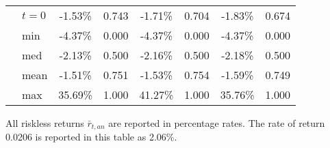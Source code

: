 \documentclass[letterpaper,12pt]{article}
\theoremstyle{definition}
\begin{document}
\begin{spacing}{1.5}
\begin{table}[htbp]
\begin{threeparttable}
\begin{tabular}{>{\small}c >{\small}l| >{\small}c >{\small}c| >{\small}c >{\small}c| >{\small}c >{\small}c}
      \hline
      \multirow{5}{*}{$\bar{H}=0.17$}
      & $t=0$ & -1.53\% & 0.743 & -1.71\% & 0.704 & -1.83\% & 0.674 \\
      & min & -4.37\% & 0.000 & -4.37\% & 0.000 & -4.37\% & 0.000 \\
      & med & -2.13\% & 0.500 & -2.16\% & 0.500 & -2.18\% & 0.500 \\
      & mean & -1.51\% & 0.751 & -1.53\% & 0.754 & -1.59\% & 0.749 \\
      & max & 35.69\% & 1.000 & 41.27\% & 1.000 & 35.76\% & 1.000 \\
      \hline\hline
    \end{tabular}
    \begin{tablenotes}
      \scriptsize{\item[]All riskless returns $\bar{r}_{t,an}$ are reported in percentage rates. The rate of return 0.0206 is reported in this table as 2.06\%.}
    \end{tablenotes}
    \end{threeparttable}
  \end{table}


\end{spacing}
\end{document}
